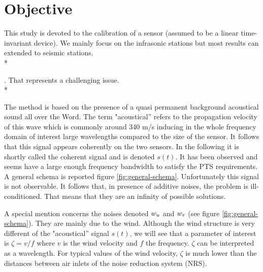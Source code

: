 \section{Objective}
This study is devoted to the calibration of a sensor (assumed to be a linear time-invariant device). We mainly focus on the infrasonic stations but most results can extended to seismic stations.\\*

. That represents a challenging issue.\\*

 The method is based on the presence of a quasi permanent background acoustical sound all over the Word. The term "acoustical'' refers to the propagation velocity of this wave which is commonly around 340 m/s inducing in the whole frequency domain of interest large wavelengths compared to the size of the sensor. It follows that this signal appears coherently on the two sensors. In the following it is shortly called the coherent signal and is denoted $s(t)$. It has been observed and seems have a large enough frequency bandwidth to satisfy the PTS requirements. A general schema is reported figure \ref{fig:general-schema}. 
Unfortunately this signal is not observable. It follows that, in presence of additive noises, the problem is ill-conditioned. That means that they are an infinity of possible solutions.

A special mention concerns the noises denoted $w_{{u}}$ and $w_{{r}}$ (see figure \ref{fig:general-schema}). They are mainly due to the wind. Although the wind structure is very different of the  "acoustical'' signal $s(t)$, we will see that a parameter of interest is $\zeta=v/f$ where $v$ is the wind velocity and $f$ the frequency. $\zeta$ can be interpreted 
as a wavelength. For typical values of the wind velocity, $\zeta$ is much lower than the distances between air inlets of the noise reduction system (NRS).

